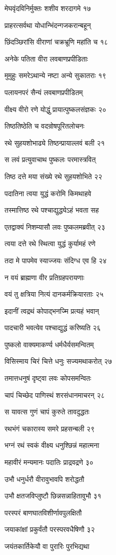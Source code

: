 मेघवृंदविनिर्मुक्तः शशीव शरदागमे १७

प्राहरत्सर्वथा योधान्भिंदन्गजकरान्बहून्

छिंदञ्छिरांसि वीराणां चक्रभ्रूणि महांति च १८

अनेके पतिता वीरा लवबाणप्रपीडिताः

मुमुहुः समरेऽथान्ये नष्टा अन्ये सुकातराः १९

पलायनपरं सैन्यं लवबाणप्रपीडितम्

वीक्ष्य वीरो रणे योद्धुं प्रायात्पुष्कलसंज्ञकः २०

तिष्ठतिष्ठेति च वदन्रोषपूरितलोचनः

रथे सुहयशोभाढ्ये तिष्ठन्प्रायाल्लवं बली २१

स लवं प्रत्युवाचाथ पुष्कलः परमास्त्रवित्

तिष्ठ दत्ते मया संख्ये रथे सुहयशोभिते २२

पदातिना त्वया युद्धं करोमि किमथाहवे

तस्मात्तिष्ठ रथे पश्चाद्युद्ध्येऽहं भवता सह

एतद्वाक्यं निशम्यासौ लवः पुष्कलमब्रवीत् २३

त्वया दत्ते रथे स्थित्वा युद्धं कुर्यामहं रणे

तदा मे पापमेव स्याज्जयः संदिग्ध एव हि २४

न वयं ब्राह्मणा वीर प्रतिग्रहपरायणाः

वयं तु क्षत्रिया नित्यं दानकर्मक्रियारताः २५

इदानीं त्वद्रथं कोपाद्भनज्मि प्रत्यहं भवान्

पादचारी भवत्येव पश्चाद्युद्धं करिष्यति २६

पुष्कलो वाक्यमाकर्ण्य धर्मधैर्यसमन्वितम्

विसिस्माय चिरं चित्ते धनुः सज्यमथाकरोत् २७

तमात्तधनुषं दृष्ट्वा लवः कोपसमन्वितः

चापं चिच्छेद पाणिस्थं शरसंधानमाचरन् २८

स यावत्स गुणं चापं कुरुते तावदुद्धतः

रथभंगं चकारास्य समरे प्रहसन्बली २९

भग्नं रथं स्वकं वीक्ष्य धनुश्छिन्नं महात्मना

महावीरं मन्यमानः पदातिः प्राद्रवद्रणे ३०

उभौ धनुर्धरौ वीरावुभावपि शरोद्धतौ

उभौ क्षतजविप्लुष्टौ छिन्नसन्नाहितावुभौ ३१

परस्परं बाणघातविशीर्णावपुलक्षितौ

जयाकांक्षां प्रकुर्वंतौ परस्परवधैषिणौ ३२

जयंतकार्तिकेयौ वा पुरारिः पुरभिद्यथा

